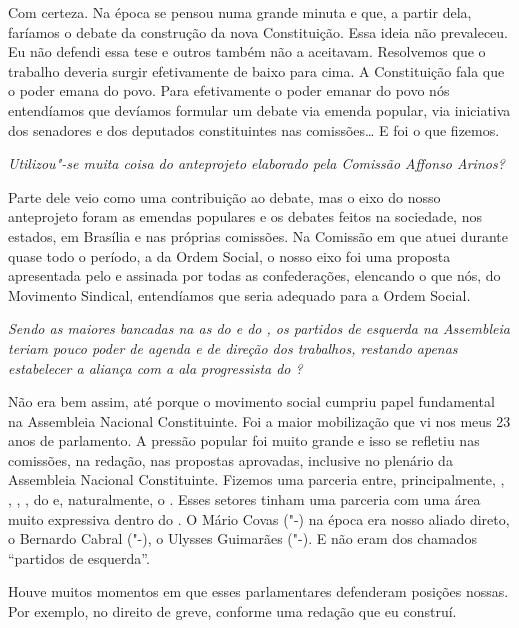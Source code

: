 Com certeza. Na época se pensou numa grande minuta e que,
a partir dela, faríamos o debate da construção da nova Constituição.
Essa ideia não prevaleceu. Eu não defendi essa tese e outros também não
a aceitavam. Resolvemos que o trabalho deveria surgir efetivamente de
baixo para cima. A Constituição fala que o poder emana do povo. Para
efetivamente o poder emanar do povo nós entendíamos que devíamos
formular um debate via emenda popular, via iniciativa dos senadores e
dos deputados constituintes nas comissões\ldots{} E foi o que fizemos.

\medskip

\noindent\emph{Utilizou"-se muita coisa do anteprojeto elaborado pela Comissão
Affonso Arinos?}

Parte dele veio como uma contribuição ao debate, mas o
eixo do nosso anteprojeto foram as emendas populares e os debates feitos
na sociedade, nos estados, em Brasília e nas próprias comissões. Na
Comissão em que atuei durante quase todo o período, a da Ordem Social, o
nosso eixo foi uma proposta apresentada pelo  e assinada por todas
as confederações, elencando o que nós, do Movimento Sindical,
entendíamos que seria adequado para a Ordem Social.

\medskip

\noindent\emph{Sendo as maiores bancadas na  as do  e do , os
partidos de esquerda na Assembleia teriam pouco poder de agenda e de
direção dos trabalhos, restando apenas estabelecer a aliança com a ala
progressista do ? }

Não era bem assim, até porque o movimento social cumpriu
papel fundamental na Assembleia Nacional Constituinte. Foi a maior
mobilização que vi nos meus 23 anos de parlamento. A pressão popular foi
muito grande e isso se refletiu nas comissões, na redação, nas propostas
aprovadas, inclusive no plenário da Assembleia Nacional Constituinte.
Fizemos uma parceria entre, principalmente, ,
, , , do e, naturalmente,
o . Esses setores tinham uma parceria com uma área muito
expressiva dentro do . O Mário Covas ("-) na época era nosso
aliado direto, o Bernardo Cabral ("-), o Ulysses Guimarães
("-). E não eram dos chamados ``partidos de esquerda''.

Houve muitos momentos em que esses parlamentares defenderam posições
nossas. Por exemplo, no direito de greve, conforme uma redação que eu
construí.

